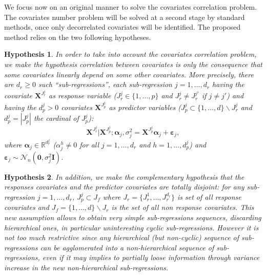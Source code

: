 \documentclass[11pt,a4paper]{article}
\newtheorem{hyp}{Hypothesis}
\begin{document}
We focus now on an original manner to solve the covariates correlation problem. The covariates number problem will be solved at a second stage by standard methods, once only decorrelated covariates will be identified. The proposed method relies on the two following hypotheses.

\begin{hyp}\label{H1}
In order to take into account the covariates correlation problem, we make the hypothesis correlation between covariates is {\it only} the consequence that some covariates {\it linearly} depend on some other covariates. More precisely, there are $d_{r}\geq 0$ such ``sub-regressions'', each sub-regression $j=1,\ldots,d_{r}$ having the covariate $\boldsymbol{X}^{J_{r}^j}$ as {\it response} variable ($J_{r}^j\in\{1,\ldots,p\}$ and $J_{r}^j\neq J_{r}^{j'}$ if $j\neq j'$) and having the $d_p^j>0$ covariates $\boldsymbol{X}^{J_{p}^j}$  as {\it predictor} variables ($J_{p}^j\subset\{1,\ldots,d\} \backslash J_{r}^j$ and $d_p^j=|J_{p}^j|$ the cardinal of $J_{p}^j$):
\begin{equation}
\boldsymbol{X}^{J_{r}^j}|\boldsymbol{X}^{J_{p}^j};\boldsymbol{\alpha}_j,\sigma^2_j=\boldsymbol{X}^{J_{p}^j}\boldsymbol{\alpha}_j+\boldsymbol{\varepsilon}_j, \label{eq:SR}
\end{equation}
where $\boldsymbol{\alpha}_j\in{\mathbb{R}^{d_r^j}}$ (${\alpha}_j^h\neq 0$ for all $j=1,\ldots,d_r$ and $h=1,\ldots,d_p^j$) and $\boldsymbol{\varepsilon}_j \sim\mathcal{N}_n(\boldsymbol{0},\sigma^2_j\boldsymbol{I})$.
\end{hyp}

\begin{hyp}\label{H2}
In addition, we make the complementary hypothesis that the responses covariates and the predictor covariates are totally disjoint: for any sub-regression $j=1,\ldots,d_{r}$, $J_{p}^j\subset J_f$ where $J_{r}=\{J_{r}^1,\ldots,J_{r}^{d_r}\}$ is set of all response covariates and $J_f=\{1,\ldots,d\} \backslash J_{r}$ is the set of all {\it non} response covariates. This new assumption allows to obtain very simple sub-regressions sequences, discarding hierarchical ones, in particular uninteresting cyclic sub-regressions. However it is not too much restrictive since any hierarchical (but non-cyclic) sequence of sub-regressions can be agglomerated into a non-hierarchical sequence of sub-regressions, even if it may implies to partially loose information through variance increase in the new non-hierarchical sub-regressions.
\end{hyp}
\end{document}
